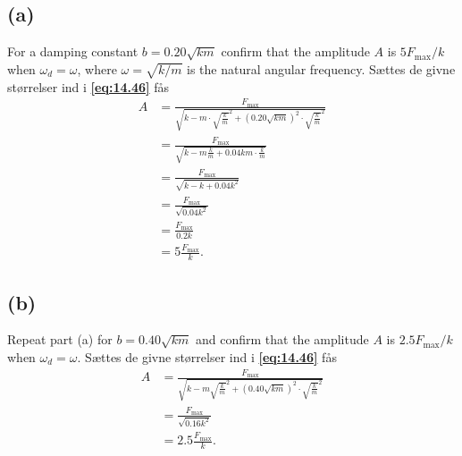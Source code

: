 \documentclass[12pt]{article}
\theoremstyle{definition}
\begin{document}
\subsection*{(a)}
For a damping constant $b = \num{0,20}\sqrt{km}$ confirm that the amplitude $A$ is $5F_{\text{max}} / k$ when $\omega_d = \omega$, where $\omega = \sqrt{k / m}$ is the natural angular frequency.
\bigbreak
Sættes de givne størrelser ind i \textbf{\autoref{eq:14.46}} fås
\begin{align*}
  A &= \frac{F_{\text{max}}}{\sqrt{k - m \cdot \sqrt{\frac{k}{m}}^2 + \left( \num{0,20} \sqrt{km} \right)^2 \cdot \sqrt{\frac{k}{m}}^2}} \\
    &= \frac{F_{\text{max}}}{\sqrt{k - m \frac{k}{m} + \num{0,04}km \cdot \frac{k}{m}}} \\
    &= \frac{F_{\text{max}}}{\sqrt{k - k + \num{0,04} k^2}} \\
    &= \frac{F_{\text{max}}}{\sqrt{\num{0,04} k^2}} \\
    &= \frac{F_{\text{max}}}{\num{0,2}k} \\
    &= 5 \frac{F_{\text{max}}}{k}
.\end{align*}


\subsection*{(b)}
Repeat part (a) for $b = \num{0,40}\sqrt{km}$ and confirm that the amplitude $A$ is $\num{2,5}F_{\text{max}} / k$ when $\omega_d = \omega$.
\bigbreak
Sættes de givne størrelser ind i \textbf{\autoref{eq:14.46}} fås
\begin{align*}
  A &= \frac{F_{\text{max}}}{\sqrt{k - m \sqrt{\frac{k}{m}}^2 + \left( \num{0,40} \sqrt{km} \right)^2 \cdot \sqrt{\frac{k}{m}}^2}} \\
  &= \frac{F_{\text{max}}}{\sqrt{\num{0,16}k^2}} \\
  &= \num{2,5} \frac{F_{\text{max}}}{k}
.\end{align*}
\end{document}
